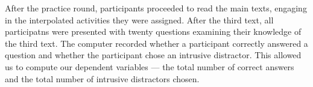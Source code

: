 \documentclass[12pt,]{article}
\begin{document}
After the practice round, participants proceeded to read the main texts,
engaging in the interpolated activities they were assigned. After the
third text, all participatns were presented with twenty questions
examining their knowledge of the third text. The computer recorded
whether a participant correctly answered a question and whether the
participant chose an intrusive distractor. This allowed us to compute
our dependent variables --- the total number of correct answers and the
total number of intrusive distractors chosen.



\end{document}
